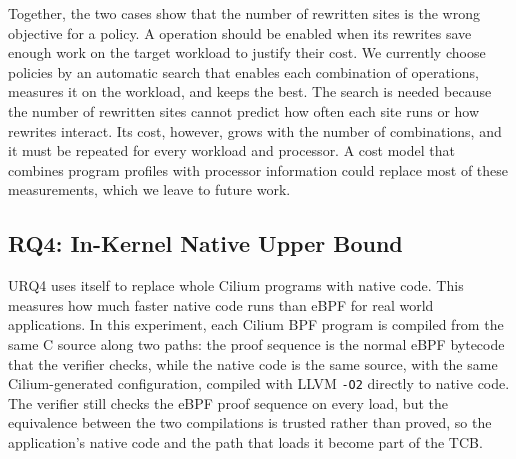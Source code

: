 Together, the two cases show that the number of rewritten sites is the wrong objective for a \lang policy.
A \lang operation should be enabled when its rewrites save enough work on the target workload to justify their cost.
We currently choose policies by an automatic search that enables each combination of \lang operations, measures it on the workload, and keeps the best.
The search is needed because the number of rewritten sites cannot predict how often each site runs or how rewrites interact.
Its cost, however, grows with the number of combinations, and it must be repeated for every workload and processor.
A cost model that combines program profiles with processor information could replace most of these measurements, which we leave to future work.


\subsection{RQ4: In-Kernel Native Upper Bound}
\label{subsec:native_upper_bound}

URQ4 uses \tool itself to replace whole Cilium programs with native code.
This measures how much faster native code runs than eBPF for real world applications.
In this experiment, each Cilium BPF program is compiled from the same C source along two paths: the proof sequence is the normal eBPF bytecode that the verifier checks, while the native code is the same source, with the same Cilium-generated configuration, compiled with LLVM \texttt{-O2} directly to native code.
The verifier still checks the eBPF proof sequence on every load, but the equivalence between the two compilations is trusted rather than proved, so the application's native code and the path that loads it become part of the TCB.



